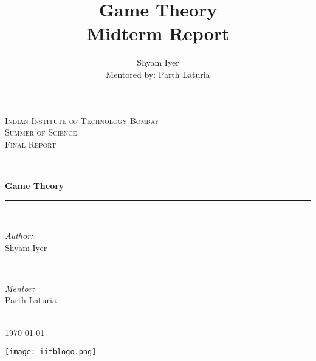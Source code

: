 \documentclass[11pt]{article}
\title{\huge{\textbf{Game Theory}}\\Midterm Report}
\author{Shyam Iyer\\Mentored by: Parth Laturia}
\theoremstyle{definition}
\begin{document}
\begin{titlepage}

\newcommand{\HRule}{\rule{\linewidth}{0.5mm}} 

\center 

\textsc{\LARGE Indian Institute of Technology Bombay}\\[1cm]
\textsc{\Large Summer of Science}\\[0.5cm] 
\textsc{\Large Final Report}\\[0.5cm] 


\HRule \\[0.6cm]
{ \huge \bfseries Game Theory}\\[0.4cm]
\HRule \\[1cm]

\begin{minipage}{0.4\textwidth}
\begin{flushleft} \large
\emph{Author:}\\
Shyam Iyer %
\end{flushleft}
\end{minipage}
~
\begin{minipage}{0.4\textwidth}
\begin{flushright} \large
\emph{Mentor:} \\
Parth Laturia %
\end{flushright}
\end{minipage}\\[2cm]

{\large \today}\\[2cm]

\vfill

\texttt{[image: iitblogo.png]}\\[1cm] 
\vfill

\end{titlepage}




\newpage

\tableofcontents
\end{document}
